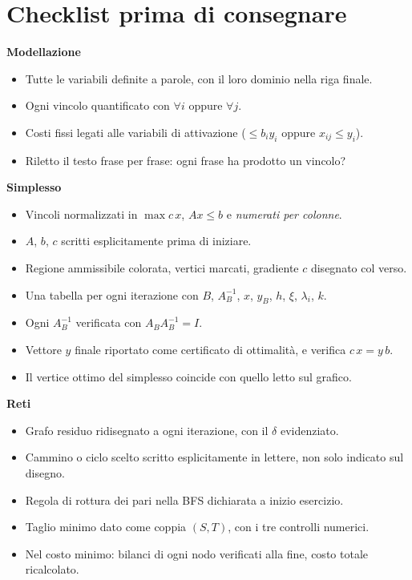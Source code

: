 \documentclass[11pt,a4paper]{article}
\begin{document}
\newpage
\section{Checklist prima di consegnare}

\begin{idea}
\textbf{Modellazione}
\begin{itemize}
\item Tutte le variabili definite a parole, con il loro dominio nella riga finale.
\item Ogni vincolo quantificato con $\forall i$ oppure $\forall j$.
\item Costi fissi legati alle variabili di attivazione ($\le b_i y_i$ oppure $x_{ij}\le y_i$).
\item Riletto il testo frase per frase: ogni frase ha prodotto un vincolo?
\end{itemize}
\end{idea}

\begin{idea}
\textbf{Simplesso}
\begin{itemize}
\item Vincoli normalizzati in $\max c\,x$, $Ax\le b$ e \emph{numerati per colonne}.
\item $A$, $b$, $c$ scritti esplicitamente prima di iniziare.
\item Regione ammissibile colorata, vertici marcati, gradiente $c$ disegnato col verso.
\item Una tabella per ogni iterazione con $B$, $A_B^{-1}$, $x$, $y_B$, $h$, $\xi$, $\lambda_i$, $k$.
\item Ogni $A_B^{-1}$ verificata con $A_B A_B^{-1} = I$.
\item Vettore $y$ finale riportato come certificato di ottimalità, e verifica $c\,x = y\,b$.
\item Il vertice ottimo del simplesso coincide con quello letto sul grafico.
\end{itemize}
\end{idea}

\begin{idea}
\textbf{Reti}
\begin{itemize}
\item Grafo residuo ridisegnato a ogni iterazione, con il $\delta$ evidenziato.
\item Cammino o ciclo scelto scritto esplicitamente in lettere, non solo indicato sul disegno.
\item Regola di rottura dei pari nella BFS dichiarata a inizio esercizio.
\item Taglio minimo dato come coppia $(S, T)$, con i tre controlli numerici.
\item Nel costo minimo: bilanci di ogni nodo verificati alla fine, costo totale ricalcolato.
\end{itemize}
\end{idea}
\end{document}
